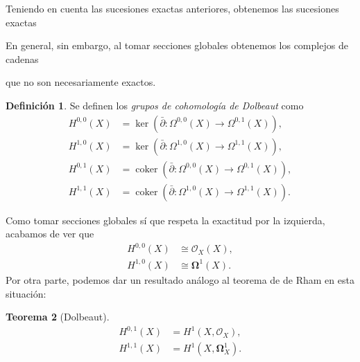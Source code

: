 \documentclass[12pt,a4paper]{article}
\newtheorem{thm}{Teorema}[section]
\theoremstyle{definition} \newtheorem{defn}[thm]{Definición}
\theoremstyle{definition} \newtheorem{ejemplo}[thm]{Ejemplo}
\theoremstyle{definition} \newtheorem{ejercicio}[thm]{Ejercicio}
\def\OO{\mathscr{O}}
\def\delbar{\bar{\partial}}
\DeclareMathOperator{\coker}{coker}
\begin{document}
  Teniendo en cuenta las sucesiones exactas anteriores, obtenemos las sucesiones exactas
 \begin{center}      \end{center}
En general, sin embargo, al tomar secciones globales obtenemos los complejos de cadenas
 \begin{center}      \end{center}
que no son necesariamente exactos. 

\begin{defn}
  Se definen los \emph{grupos de cohomología de Dolbeaut} como
  \begin{align*}
    H^{0,0}(X)&=\ker(\delbar:\Omega^{0,0}(X) \rightarrow \Omega^{0,1}(X)), \\
    H^{1,0}(X)&=\ker(\delbar:\Omega^{1,0}(X) \rightarrow \Omega^{1,1}(X)), \\
    H^{0,1}(X)&=\coker(\delbar:\Omega^{0,0}(X) \rightarrow \Omega^{0,1}(X)), \\
    H^{1,1}(X)&=\coker(\delbar:\Omega^{1,0}(X) \rightarrow \Omega^{1,1}(X)) .
  \end{align*}
\end{defn}

Como tomar secciones globales sí que respeta la exactitud por la izquierda, acabamos de ver que
\begin{align*}
  H^{0,0}(X) & \cong \OO_X(X), \\
  H^{1,0}(X) & \cong \boldsymbol{\Omega}^1 (X).
\end{align*}
Por otra parte, podemos dar un resultado análogo al teorema de de Rham en esta situación:

\begin{thm}[Dolbeaut]
  \begin{align*}
    H^{0,1}(X) &= H^1(X,\OO_X), \\
    H^{1,1}(X) &= H^1(X,\boldsymbol{\Omega}^1_X).
  \end{align*}
\end{thm}
\end{document}
